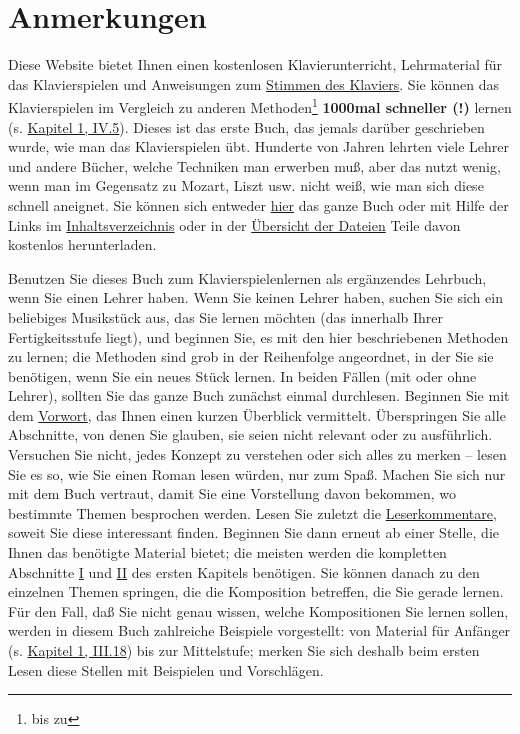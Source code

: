 
\chapter{Anmerkungen}
\label{anmerkungen}

Diese Website bietet Ihnen einen kostenlosen Klavierunterricht, Lehrmaterial für das Klavierspielen und Anweisungen zum \hyperref[c2_1]{Stimmen des Klaviers}.
Sie können das Klavierspielen im Vergleich zu anderen Methoden\footnote{bis zu} \textbf{1000mal schneller (!)} lernen (s. \hyperref[c1iv5]{Kapitel 1, IV.5}).
Dieses ist das erste Buch, das jemals darüber geschrieben wurde, wie man das Klavierspielen übt.
Hunderte von Jahren lehrten viele Lehrer und andere Bücher, welche Techniken man erwerben muß, aber das nutzt wenig, wenn man im Gegensatz zu Mozart, Liszt usw. nicht weiß, wie man sich diese schnell aneignet.
Sie können sich entweder \hyperref[copy]{hier} das ganze Buch oder mit Hilfe der Links im \hyperref[Inhalt]{Inhaltsverzeichnis} oder in der \href{http://foppde.uteedgar\-lins.de/foppde.html\#copy}{Übersicht der Dateien} Teile davon kostenlos herunterladen.

Benutzen Sie dieses Buch zum Klavierspielenlernen als ergänzendes Lehrbuch, wenn Sie einen Lehrer haben.
Wenn Sie keinen Lehrer haben, suchen Sie sich ein beliebiges Musikstück aus, das Sie lernen möchten (das innerhalb Ihrer Fertigkeitsstufe liegt), und beginnen Sie, es mit den hier beschriebenen Methoden zu lernen; die Methoden sind grob in der Reihenfolge angeordnet, in der Sie sie benötigen, wenn Sie ein neues Stück lernen.
In beiden Fällen (mit oder ohne Lehrer), sollten Sie das ganze Buch zunächst einmal durchlesen.
Beginnen Sie mit dem \hyperref[preface]{Vorwort}, das Ihnen einen kurzen Überblick vermittelt.
Überspringen Sie alle Abschnitte, von denen Sie glauben, sie seien nicht relevant oder zu ausführlich.
Versuchen Sie nicht, jedes Konzept zu verstehen oder sich alles zu merken -- lesen Sie es so, wie Sie einen Roman lesen würden, nur zum Spaß.
Machen Sie sich nur mit dem Buch vertraut, damit Sie eine Vorstellung davon bekommen, wo bestimmte Themen besprochen werden.
Lesen Sie zuletzt die \hyperref[testimonials]{Leserkommentare}, soweit Sie diese interessant finden.
Beginnen Sie dann erneut ab einer Stelle, die Ihnen das benötigte Material bietet; die meisten werden die kompletten Abschnitte \hyperref[c1i1]{I} und \hyperref[c1ii1]{II} des ersten Kapitels benötigen.
Sie können danach zu den einzelnen Themen springen, die die Komposition betreffen, die Sie gerade lernen.
Für den Fall, daß Sie nicht genau wissen, welche Kompositionen Sie lernen sollen, werden in diesem Buch zahlreiche Beispiele vorgestellt: von Material für Anfänger (s. \hyperref[c1iii18]{Kapitel 1, III.18}) bis zur Mittelstufe; merken Sie sich deshalb beim ersten Lesen diese Stellen mit Beispielen und Vorschlägen.

